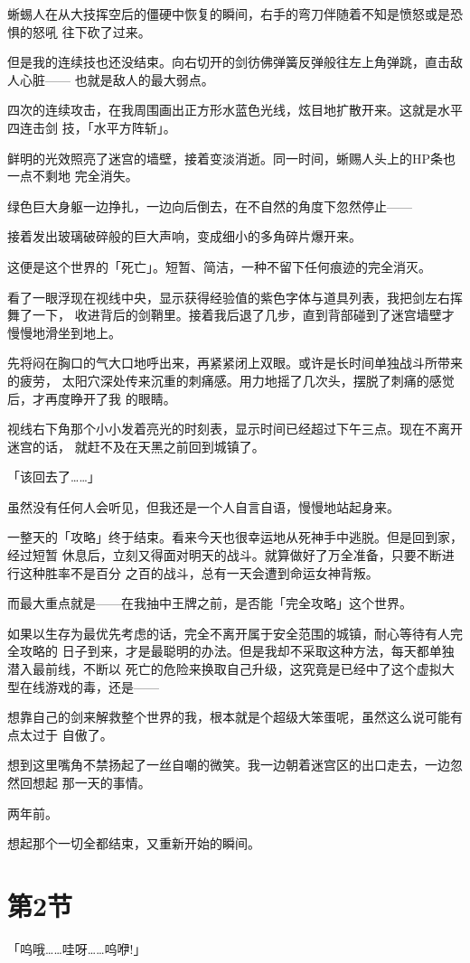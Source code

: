 \documentclass[11pt]{book}
\begin{document}
蜥蜴人在从大技挥空后的僵硬中恢复的瞬间，右手的弯刀伴随着不知是愤怒或是恐惧的怒吼
往下砍了过来。

但是我的连续技也还没结束。向右切开的剑彷佛弹簧反弹般往左上角弹跳，直击敌人心脏——
也就是敌人的最大弱点。

四次的连续攻击，在我周围画出正方形水蓝色光线，炫目地扩散开来。这就是水平四连击剑
技，「水平方阵斩」。

鲜明的光效照亮了迷宫的墙壁，接着变淡消逝。同一时间，蜥赐人头上的HP条也一点不剩地
完全消失。

绿色巨大身躯一边挣扎，一边向后倒去，在不自然的角度下忽然停止——

接着发出玻璃破碎般的巨大声响，变成细小的多角碎片爆开来。

这便是这个世界的「死亡」。短暂、简洁，一种不留下任何痕迹的完全消灭。

看了一眼浮现在视线中央，显示获得经验值的紫色字体与道具列表，我把剑左右挥舞了一下，
收进背后的剑鞘里。接着我后退了几步，直到背部碰到了迷宫墙壁才慢慢地滑坐到地上。

先将闷在胸口的气大口地呼出来，再紧紧闭上双眼。或许是长时间单独战斗所带来的疲劳，
太阳穴深处传来沉重的刺痛感。用力地摇了几次头，摆脱了刺痛的感觉后，才再度睁开了我
的眼睛。

视线右下角那个小小发着亮光的时刻表，显示时间已经超过下午三点。现在不离开迷宫的话，
就赶不及在天黑之前回到城镇了。

「该回去了……」

虽然没有任何人会听见，但我还是一个人自言自语，慢慢地站起身来。

一整天的「攻略」终于结束。看来今天也很幸运地从死神手中逃脱。但是回到家，经过短暂
休息后，立刻又得面对明天的战斗。就算做好了万全准备，只要不断进行这种胜率不是百分
之百的战斗，总有一天会遭到命运女神背叛。

而最大重点就是——在我抽中王牌之前，是否能「完全攻略」这个世界。

如果以生存为最优先考虑的话，完全不离开属于安全范围的城镇，耐心等待有人完全攻略的
日子到来，才是最聪明的办法。但是我却不采取这种方法，每天都单独潜入最前线，不断以
死亡的危险来换取自己升级，这究竟是已经中了这个虚拟大型在线游戏的毒，还是——

想靠自己的剑来解救整个世界的我，根本就是个超级大笨蛋呢，虽然这么说可能有点太过于
自傲了。

想到这里嘴角不禁扬起了一丝自嘲的微笑。我一边朝着迷宫区的出口走去，一边忽然回想起
那一天的事情。

两年前。

想起那个一切全都结束，又重新开始的瞬间。
\section{第2节}
\label{sec:orge837edb}
「呜哦……哇呀……呜咿!」
\end{document}
